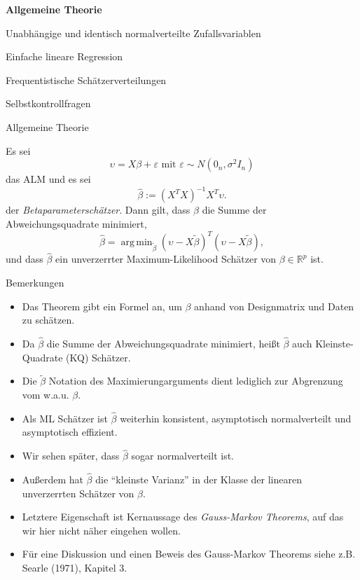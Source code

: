 \documentclass[
  8pt,
  ignorenonframetext,
]{beamer}
\providecommand{\tightlist}{%
  \setlength{\itemsep}{0pt}\setlength{\parskip}{0pt}}
\DeclareMathOperator*{\argmin}{arg\,min}
\begin{document}
\begin{frame}{}
\protect\hypertarget{section-8}{}
\large
{}
\vfill

\textbf{Allgemeine Theorie}

Unabhängige und identisch normalverteilte Zufallsvariablen

Einfache lineare Regression

Frequentistische Schätzerverteilungen

Selbstkontrollfragen \vfill
\end{frame}

\begin{frame}{Allgemeine Theorie}
\protect\hypertarget{allgemeine-theorie}{}
\footnotesize
\begin{theorem}[Betaparameterschätzer]
\justifying
\normalfont
Es sei
\begin{equation}
\upsilon = X\beta + \varepsilon \mbox{ mit } \varepsilon \sim N(0_n,\sigma^2I_n)
\end{equation}
das ALM und es sei
\begin{equation}
\hat{\beta} := \left(X^TX\right)^{-1}X^T\upsilon.
\end{equation}
der \textit{Betaparameterschätzer}. Dann gilt, dass $\hat{\beta}$ die Summe der Abweichungsquadrate minimiert,
\begin{equation}
\hat{\beta} = \argmin_{\tilde{\beta}} (\upsilon-X\tilde{\beta})^T(\upsilon-X\tilde{\beta}),
\end{equation}
und dass $\hat{\beta}$ ein unverzerrter Maximum-Likelihood Schätzer von $\beta \in \mathbb{R}^p$ ist.
\end{theorem}

Bemerkungen

\begin{itemize}
\tightlist
\item
  Das Theorem gibt ein Formel an, um \(\beta\) anhand von Designmatrix
  und Daten zu schätzen.
\item
  Da \(\hat{\beta}\) die Summe der Abweichungsquadrate minimiert, heißt
  \(\hat{\beta}\) auch Kleinste-Quadrate (KQ) Schätzer.
\item
  Die \(\tilde{\beta}\) Notation des Maximierungarguments dient
  lediglich zur Abgrenzung vom w.a.u. \(\beta\).
\item
  Als ML Schätzer ist \(\hat{\beta}\) weiterhin konsistent, asymptotisch
  normalverteilt und asymptotisch effizient.
\item
  Wir sehen später, dass \(\hat{\beta}\) sogar normalverteilt ist.
\item
  Außerdem hat \(\hat{\beta}\) die ``kleinste Varianz'' in der Klasse
  der linearen unverzerrten Schätzer von \(\beta\).
\item
  Letztere Eigenschaft ist Kernaussage des
  \textit{Gauss-Markov Theorems}, auf das wir hier nicht näher eingehen
  wollen.
\item
  Für eine Diskussion und einen Beweis des Gauss-Markov Theorems siehe
  z.B. Searle (1971), Kapitel 3.
\end{itemize}
\end{frame}
\end{document}

